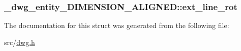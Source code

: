 \hypertarget{struct__dwg__entity__DIMENSION__ALIGNED_a7d51fe4008d42821b8058f789726a08f}{
\subsubsection[{ext\-\_\-line\-\_\-rot}]{ {\bf \-\_\-dwg\-\_\-entity\-\_\-\-D\-I\-M\-E\-N\-S\-I\-O\-N\-\_\-\-A\-L\-I\-G\-N\-E\-D\-::ext\-\_\-line\-\_\-rot}}}\label{struct__dwg__entity__DIMENSION__ALIGNED_a7d51fe4008d42821b8058f789726a08f}


\-The documentation for this struct was generated from the following file\-:\begin{DoxyCompactItemize}
\item 
src/\hyperlink{dwg_8h}{dwg.\-h}\end{DoxyCompactItemize}
